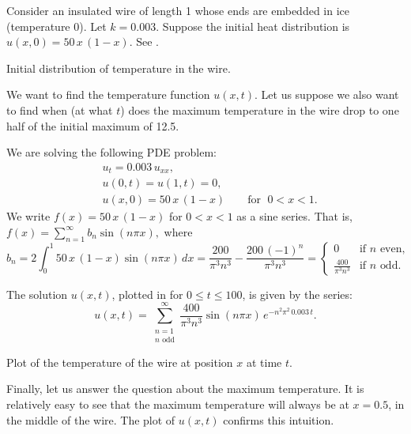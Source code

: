 \begin{example}
Consider
an insulated wire of length 1 whose
ends are embedded in ice (temperature 0).
Let $k=0.003$.  Suppose the initial heat distribution
is $u(x,0) = 50\,x\,(1-x)$.
See .

\begin{myfig}
\capstart
{}
\caption{Initial distribution of temperature in the
wire.\label{heat:wireexinitfig}}
\end{myfig}

We want to find the temperature function $u(x,t)$.  Let us suppose we also
want to find when (at what $t$) does the maximum temperature in the wire 
drop to one half of the initial maximum of 12.5.

We are solving the following PDE problem:
\begin{align*}
& u_t = 0.003 \, u_{xx} , \\
& u(0,t) = u(1,t) = 0 , \\
& u(x,0) = 50\,x\,(1-x) \qquad \text{for } \; 0 < x < 1 .
\end{align*}
We write $f(x) = 50\,x\,(1-x)$ for $0 < x < 1$ as a sine series.  That is,
$
f(x) = \sum_{n=1}^\infty b_n \sin (n \pi x) ,
$
where
\begin{equation*}
b_n = 2 \int_0^1 50\,x\,(1-x) \sin (n \pi x) \,dx
= 
\frac{200}{{\pi }^{3}{n}^{3}}-\frac{200\,{\left( -1\right) }^{n}}{{\pi }^{3}{n}^{3}}
=
\begin{cases}
0 & \text{if } n \text{ even} , \\
\frac{400}{\pi^3 n^3} & \text{if } n \text{ odd} .
\end{cases}
\end{equation*}

The solution $u(x,t)$, plotted in
 for $0 \leq t \leq 100$,
is given by the series:
\begin{equation*}
u(x,t) = 
\sum_{\substack{n=1 \\ n \text{ odd}}}^\infty
\frac{400}{\pi^3 n^3}
\sin (n \pi x )
\, e^{-n^2 \pi^2 \, 0.003 \, t} .
\end{equation*}

\begin{myfig}
\capstart
{}
\caption{Plot of the temperature of the wire at position $x$
at time $t$.\label{heat:wireexfig}}
\end{myfig}

Finally, let us answer the question about the maximum temperature.  It is
relatively easy to see
that the maximum temperature will always be at $x=0.5$, in
the middle of the wire.  The plot of $u(x,t)$ confirms this intuition.


\end{example}
